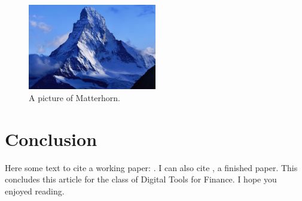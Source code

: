 \documentclass[titlepage]{article}
\begin{document}
\begin{figure}[h]
  \centering
    \includegraphics[width=0.5\textwidth]{matterhorn.jpg}
    \caption{A picture of Matterhorn.\protect\footnotemark[2]}
\end{figure}


\section{Conclusion}
Here some text to cite a working paper: \cite{Kozlowski2020}. I can also cite \cite{Gormsen2020}, a finished paper. This concludes this article for the class of Digital Tools for Finance. I hope you enjoyed reading.
\newpage
\printbibliography
\end{document}
